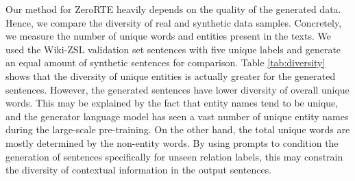 \documentclass[11pt]{article}
\begin{document}
\begin{table}[t!]
    \centering
    \caption{Additional hyperparameters.} 
    \label{tab:params}
\end{table}

Our method for ZeroRTE heavily depends on the quality of the generated data.
Hence, we compare the diversity of real and synthetic data samples.
Concretely, we measure the number of unique words and entities present in the texts.
We used the Wiki-ZSL validation set sentences with five unique labels and generate an equal amount of synthetic sentences for comparison.
Table \ref{tab:diversity} shows that the diversity of unique entities is actually greater for the generated sentences. 
However, the generated sentences have lower diversity of overall unique words.
This may be explained by the fact that entity names tend to be unique, and the generator language model has seen a vast number of unique entity names during the large-scale pre-training.
On the other hand, the total unique words are mostly determined by the non-entity words.
By using prompts to condition the generation of sentences specifically for unseen relation labels, this may constrain the diversity of contextual information in the output sentences.


\begin{table}[t!]
    \centering
    \caption{Data diversity comparison.} 
    \label{tab:diversity}
\end{table}
\end{document}
